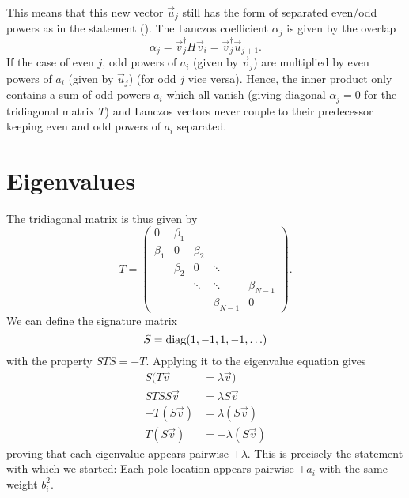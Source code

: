 This means that this new vector $\vec{u}_j$ still has the form of separated even/odd powers
as in the statement ().
The Lanczos coefficient $\alpha_j$ is given by the overlap
\begin{equation}
    \alpha_j
    =
    \vec{v}_j^\dagger H \vec{v}_i
    =
    \vec{v}_j^\dagger \vec{u}_{j+1}.
\end{equation}
If the case of even $j$, odd powers of $a_i$ (given by $\vec{v}_j$)
are multiplied by even powers of $a_i$ (given by $\vec{u}_j$)
(for odd $j$ vice versa).
Hence, the inner product only contains a sum of odd powers $a_i$ which all vanish
(giving diagonal $\alpha_j = 0$ for the tridiagonal matrix $T$)
and Lanczos vectors never couple to their predecessor
keeping even and odd powers of $a_i$ separated.

\section{Eigenvalues}

The tridiagonal matrix is thus given by
\begin{equation}
    T
    =
    \begin{pmatrix}
        0       & \beta_1 &         &             &             \\
        \beta_1 & 0       & \beta_2 &             &             \\
                & \beta_2 & 0       & \ddots      &             \\
                &         & \ddots  & \ddots      & \beta_{N-1} \\
                &         &         & \beta_{N-1} & 0
    \end{pmatrix}.
\end{equation}
We can define the signature matrix
\begin{equation}
    S = \operatorname{diag}(1, -1, 1, -1, \ldots)
\end{equation}
with the property $S T S = -T$.
Applying it to the eigenvalue equation gives
\begin{align}
    S(T \vec{v}   & = \lambda \vec{v})    \\
    ST SS\vec{v}  & = \lambda S\vec{v}    \\
    -T (S\vec{v}) & = \lambda (S\vec{v})  \\
    T (S\vec{v})  & = -\lambda (S\vec{v})
\end{align}
proving that each eigenvalue appears pairwise $\pm\lambda$.
This is precisely the statement with which we started:
Each pole location appears pairwise $\pm a_i$ with the same weight $b_i^2$.
